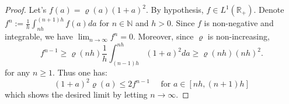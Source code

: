 \documentclass[]{jnsao}
\newcommand{\kernel}{\varrho}
\begin{document}
\begin{proof}
	Let's $f(a) = \kernel(a)(1+a)^2$. By hypothesis, $f \in L^1(\mathbb{R}_+)$.
	Denote $f^n:= \frac{1}{h} \int_{nh}^{(n+1)h} f(a) da$ for $n \in \mathbb{N}$ and $h > 0$.
	Since $f$ is non-negative and integrable, we have $\lim_{n \to \infty} f^n = 0$.
	Moreover, since $\kernel$ is non-increasing,
	\[
	f^{n-1}\geq \kernel(nh) \frac{1}{h}  \int_{(n-1)h}^{nh} (1+a)^2 da \geq  
	\kernel(nh) (nh)^2.
	\]
	for any $n \geq 1$. Thus one has:
	$$
	(1+a)^2 \kernel(a) \leq 2 f^{n-1} \quad \text{ for } a \in [nh, (n+1)h]
	$$
	which shows the desired limit by letting $n \to \infty$.
\end{proof}



	
% 
% 
% 
% 	
\end{document}
